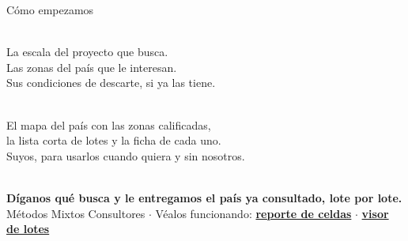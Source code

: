 \documentclass[aspectratio=169, 11pt]{beamer}
\begin{document}
%
\begin{frame}{Cómo empezamos}
  \vspace{0.6em}
  \begin{minipage}[t]{0.47\textwidth}
    \raggedright
    \\[0.7em]{\footnotesize\textcolor{tinta2}{La escala del proyecto que busca.\\[0.30em]
    Las zonas del país que le interesan.\\[0.30em]
    Sus condiciones de descarte, si ya las tiene.}}
  \end{minipage}\hfill
  \begin{minipage}[t]{0.47\textwidth}
    \raggedright
    \\[0.7em]{\footnotesize\textcolor{tinta2}{El mapa del país con las zonas calificadas,\\[0.30em]
    la lista corta de lotes y la ficha de cada uno.\\[0.30em]
    Suyos, para usarlos cuando quiera y sin nosotros.}}
  \end{minipage}

  \vspace{1.5em}
  \hspace{0.01\textwidth}\begin{minipage}{0.96\textwidth}
    \filete\\[0.9em]
    {\small\textcolor{tinta}{\textbf{Díganos qué busca y le entregamos el país ya consultado, lote por lote.}}}\\[0.45em]
    {\footnotesize\textcolor{tinta2}{Métodos Mixtos Consultores $\cdot$ Véalos funcionando:
    \href{reporte_grillas.html}{\textbf{reporte de celdas}} $\cdot$
    \href{reporte_predios.html}{\textbf{visor de lotes}}}}
  \end{minipage}

  \vspace{0.9em}
  \hspace{0.01\textwidth}\begin{minipage}{0.96\textwidth}
  \end{minipage}
\end{frame}
\end{document}
